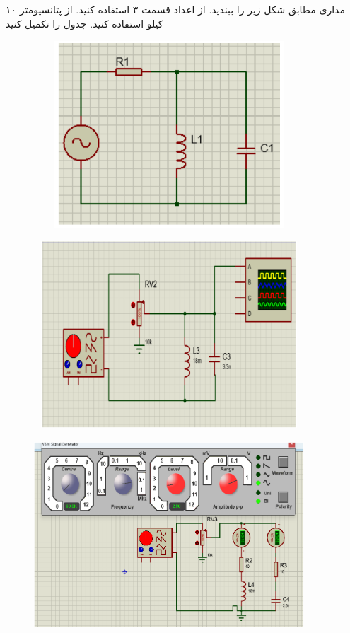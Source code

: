 \documentclass[12pt]{article}
\begin{document}
\clearpage
\subsection{}
مداری مطابق شکل زیر را ببندید. از اعداد قسمت ۳ استفاده کنید. از پتانسیومتر ۱۰ کیلو استفاده کنید.						جدول را تکمیل کنید

\begin{figure}[H]
	\begin{center}
		\includegraphics[width=0.9\textwidth, height=7cm]{./images/6.4}
	\end{center}
\end{figure}

\begin{figure}[H]
\begin{center}
\includegraphics[width=0.9\textwidth, height=7cm]{./images/6.4.a.1}
\end{center}
\end{figure}

\begin{figure}[H]
\begin{center}
\includegraphics[width=0.9\textwidth, height=7cm]{./images/6.4.a.2}
\end{center}
\end{figure}
\end{document}

